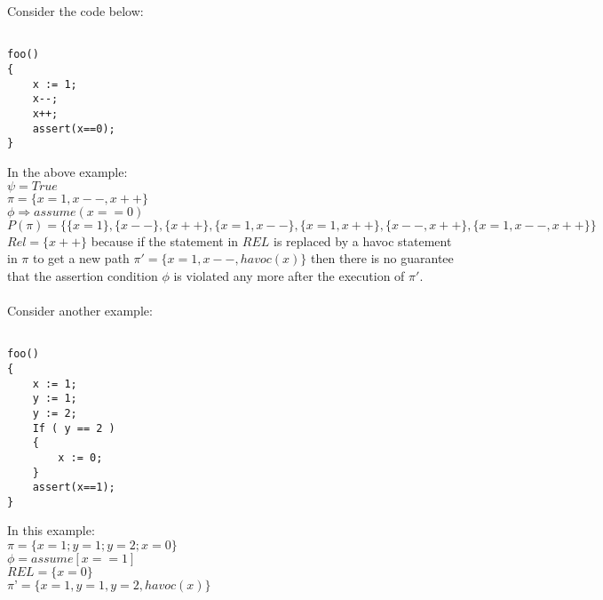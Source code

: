 \documentclass{article}
\begin{document}
\\
\\
Consider the code below:
\begin{lstlisting}

foo()
{
	x := 1;
	x--;
	x++;
	assert(x==0);
}

\end{lstlisting}
In the above example:\\
$\psi = True$            \\
$\pi = \{ x=1, x--, x++\} $\\    
$\phi \Rightarrow assume(x==0) $   
$${P}(\pi) =\{\{x=1\}, \{x--\},\{x++\}, \{x=1,x--\},\{x=1,x++\},\{x--,x++\},\{x=1,x--,x++\}\}$$
$Rel =\{x++\}$ because if the statement in $REL$ is replaced by a havoc statement in $\pi$ to get a new path $\pi' =\{x=1, x--, havoc(x)\}$ then there is no guarantee that the assertion condition $\phi$ is violated any more after the execution of $\pi'$.
\\
\\
Consider another example:
\begin{lstlisting}

foo()
{
	x := 1;
	y := 1;
	y := 2;
	If ( y == 2 )
	{
		x := 0;
	}
	assert(x==1);
}

\end{lstlisting}
In this example: \\
$\pi = \{ x=1; y=1; y=2; x=0 \} $\\
$\phi = assume[x==1]$\\
$REL = \{ x=0 \}$ \\
$\pi’ = \{x=1, y=1, y=2, havoc(x)\}$
\end{document}
